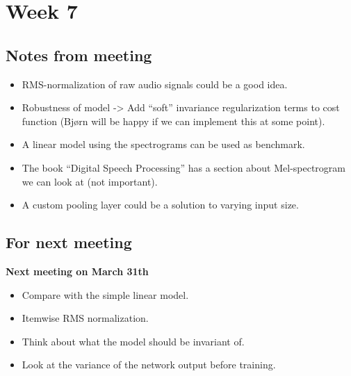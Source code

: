
\section{Week 7}

\subsection{Notes from meeting}

\begin{itemize}
\item RMS-normalization of raw audio signals could be a good idea.
\item Robustness of model -> Add ``soft'' invariance regularization terms to cost function (Bjørn will be happy if we can implement this at some point).
\item A linear model using the spectrograms can be used as benchmark.
\item The book ``Digital Speech Processing'' has a section about Mel-spectrogram we can look at (not important).
\item A custom pooling layer could be a solution to varying input size.
\end{itemize}

\subsection{For next meeting}

\textbf{Next meeting on March 31th}

\begin{itemize}
\item Compare with the simple linear model.
\item Itemwise RMS normalization.
\item Think about what the model should be invariant of.
\item Look at the variance of the network output before training.
\end{itemize}
